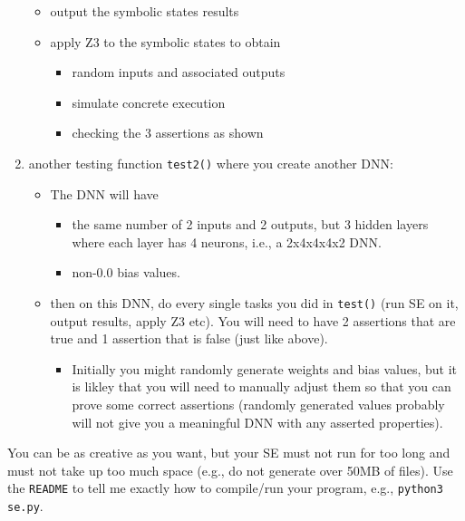 \documentclass[oneside,11pt,dvipsnames]{book}
\numberwithin{equation}{section}
\theoremstyle{definition}
\theoremstyle{remark}
\newcommand{\code}[1]{\texttt{#1}}
\begin{document}
\begin{enumerate}
\begin{itemize}
    \item output the symbolic states results
    \item apply Z3 to the symbolic states to obtain
        \begin{itemize}
        \item random inputs and associated outputs
        \item simulate concrete execution
        \item checking the 3 assertions as shown
        \end{itemize}
    \end{itemize}
\item another testing function \texttt{test2()} where you create another DNN:
    \begin{itemize}
    \item The DNN will have 
        \begin{itemize}
        \item the same number of 2 inputs and 2 outputs, but 3 hidden layers where each layer  has 4  neurons, i.e., a 2x4x4x4x2 DNN.
        \item non-0.0 bias values.
        \end{itemize}
    \item then on this DNN, do every single tasks you did in \texttt{test()}  (run SE on it, output results, apply Z3 etc).  You will need to have 2 assertions that are true and 1 assertion that is false (just like above).
        \begin{itemize}
        \item Initially you might randomly generate weights and bias values, but it is likley that you will need to manually adjust them so that you can prove some correct assertions (randomly generated values probably will not give you a meaningful DNN with any asserted properties).
        \end{itemize}
    \end{itemize}
\end{enumerate}


You can be as creative as you want, but your SE must not run for too long and must not take up too much space (e.g., do not generate over 50MB of files).  Use the \code{README} to tell me exactly how to compile/run your program, e.g., \code{python3 se.py}.
\end{document}

